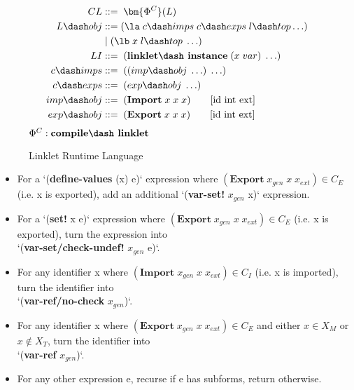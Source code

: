 \begin{wrapfigure}[14]{r}{0.45\textwidth}
  \vspace{-0.6cm}
  \footnotesize
  \begin{mdframed}
    \begin{align*}
      CL             &::=\; \bm{\Phi^C}(L)\\
      L\dash obj     &::= (\la\; c\dash imps \; c\dash exps \; l\dash top \ldots)\\
      \;           &\;|\; (\lb\; x\; l\dash top\; \ldots) \\
      LI             &::=\; (\textbf{linklet\dash instance}\; (x\; var)\; \ldots) \\
      c\dash imps    &::=\; ((imp\dash obj\; \ldots)\; \ldots)\\
      c\dash exps    &::=\; (exp\dash obj\; \ldots)\\
      imp\dash obj   &::=\; (\textbf{Import}\; x\; x\; x) \tag*{[id int ext]} \\
      exp\dash obj   &::=\; (\textbf{Export}\; x\; x\; x) \tag*{[id int ext]} \\
    \end{align*}
    \hfill \footnotesize $\Phi^C : \textbf{compile\dash linklet}$
    \caption[aaa]{Linklet Runtime Language }
    \label{fig:linklet-runtime}
  \end{mdframed}
\end{wrapfigure}

\begin{itemize}
  \small
\item For a `(\textbf{define-values} (x) e)` expression where $(\textbf{Export}\; x_{gen}\; x\; x_{ext}) \in \mathit{C_E}$ (i.e. x is exported), add an additional `(\textbf{var-set!} $x_{gen}$ x)` expression.
\item For a `(\textbf{set!} x e)` expression where $(\textbf{Export}\; x_{gen}\; x\; x_{ext}) \in \mathit{C_E}$ (i.e. x is exported), turn the expression into \\ `(\textbf{var-set/check-undef!} $x_{gen}$ e)`.
\item For any identifier x where $(\textbf{Import}\; x_{gen}\; x\; x_{ext}) \in \mathit{C_I}$  (i.e. x is imported), turn the identifier into \\ `(\textbf{var-ref/no-check} $x_{gen}$)`.
\item For any identifier x where $(\textbf{Export}\; x_{gen}\; x\; x_{ext}) \in \mathit{C_E}$ and either $x \in \mathit{X_M}$ or $x \notin \mathit{X_T}$, turn the identifier into \\ `(\textbf{var-ref} $x_{gen}$)`.
\item For any other expression e, recurse if e has subforms, return otherwise.
\end{itemize}

